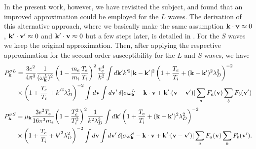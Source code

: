 \documentclass[12pt,a4paper,ruledheader]{report}
\def\bk{{\bf k}}
\begin{document}
In the present work, however, we have revisited the subject, and found
that an improved approximation could be employed for the $L$ waves. The
derivation of this alternative approach, where we basically make the
same assumption ${\bf k \cdot v}\approx 0$, ${\bf k'\cdot v'}\approx 0$
and ${\bf k' \cdot v}\approx 0$ but a few steps later, is detailed in
. For the $S$ waves we keep the original approximation. 
Then, after applying the respective approximation for the
second order susceptibility for the $L$ and $S$ waves, we have
\begin{equation}
  \label{PkL}
  \begin{split}
      P_{\bf k}^{\sigma L}
  &= \frac{3e^2}{4\pi^3}\frac{1}{(\omega_\bk^L)^2}
    \left(1-\frac{m_e}{m_i}\frac{T_e}{T_i}\right)^2\frac{v_e^4}{k^2}
    \int d{\bf k}'k'^2|{\bf k- k'}|^2\left(1+\frac{T_e}{T_i}
    +({\bf k}-{\bf k}')^2\lambda_D^2\right)^{-2}\\
  &\times\left(1+\frac{T_e}{T_i}
    +{k'}^2\lambda_D^2\right)^{-2} \int d{\bf v}\int d{\bf v}'\,
    \delta[\sigma \omega_{\bf k}^L-{\bf k \cdot v}
    +{\bf k'\cdot}({\bf v}-{\bf v}')]
    \sum_aF_a({\bf v})\sum_bF_b({\bf v}')
  \end{split}
\end{equation}
\begin{equation}
  \label{PkS}
  \begin{split}
      P_{\bf k}^{\sigma S}
  &= \mu_{\bf k}\frac{3e^2T_e}{16\pi^3m_e}
    \biggl(1-\frac{T_e^2}{T_i^2}\biggr)^2\frac{1}{k^2\lambda_D^2}
    \int d{\bf k}'\left(1+\frac{T_e}{T_i}
    +({\bf k}-{\bf k}')^2\lambda_D^2\right)^{-2}\\
  & \times\left(1+\frac{T_e}{T_i}
    +{k'}^2\lambda_D^2\right)^{-2}\int d{\bf v}\int d{\bf v}'\,
    \delta[\sigma\omega_{\bf k}^S-{\bf k \cdot v}
    +{\bf k'\cdot}({\bf v}-{\bf v}')]
    \sum_a F_a({\bf v})\sum_b F_b({\bf v}').
  \end{split}
\end{equation}
\end{document}
